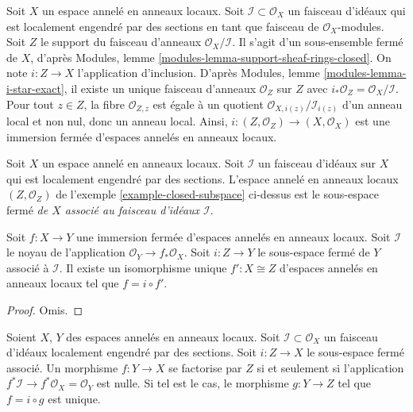 \begin{example}
\label{example-closed-subspace}
Soit $X$ un espace annelé en anneaux
locaux. Soit $\mathcal{I} \subset \mathcal{O}_X$ un faisceau
d'idéaux qui est localement engendré par des sections en tant
que faisceau de $\mathcal{O}_X$-modules. Soit $Z$ le support
du faisceau d'anneaux $\mathcal{O}_X/\mathcal{I}$. Il
s'agit d'un sous-ensemble fermé de
$X$, d'après Modules, lemme \ref{modules-lemma-support-sheaf-rings-closed}.
On note $i : Z \to X$ l'application
d'inclusion. D'après Modules, lemme \ref{modules-lemma-i-star-exact},
il existe un unique faisceau d'anneaux $\mathcal{O}_Z$
sur $Z$ avec $i_*\mathcal{O}_Z = \mathcal{O}_X/\mathcal{I}$.
Pour tout $z \in Z$, la fibre $\mathcal{O}_{Z,
z}$ est égale à un quotient $\mathcal{O}_{X, i(z)}/\mathcal{I}_{i(z)}$ d'un
anneau local et non nul, donc un anneau local. Ainsi,
$i : (Z, \mathcal{O}_Z) \to (X, \mathcal{O}_X)$ est une
immersion fermée d'espaces annelés en anneaux locaux.
\end{example}

\begin{definition}
\label{definition-closed-subspace}
Soit $X$ un espace annelé en anneaux
locaux. Soit $\mathcal{I}$ un faisceau d'idéaux sur
$X$ qui est localement engendré par des
sections. L'espace annelé en anneaux locaux $(Z,
\mathcal{O}_Z)$ de l'exemple \ref{example-closed-subspace}
ci-dessus est le sous-espace fermé {\it de $X$ associé
au faisceau d'idéaux $\mathcal{I}$}.
\end{definition}

\begin{lemma}
\label{lemma-closed-immersion}
Soit $f : X \to Y$ une immersion fermée d'espaces
annelés en anneaux locaux. Soit $\mathcal{I}$
le noyau de l'application $\mathcal{O}_Y \to f_*\mathcal{O}_X$.
Soit $i : Z \to Y$ le sous-espace fermé de $Y$
associé à $\mathcal{I}$. Il
existe un isomorphisme unique $f' : X \cong Z$ d'espaces
annelés en anneaux locaux tel que $f = i \circ f'$.
\end{lemma}

\begin{proof}
Omis.
\end{proof}

\begin{lemma}
\label{lemma-characterize-closed-subspace}
Soient $X$, $Y$ des espaces annelés en anneaux
locaux. Soit $\mathcal{I} \subset \mathcal{O}_X$ un faisceau d'idéaux localement
engendré par des sections. Soit $i : Z \to X$ le sous-espace fermé associé.
Un morphisme $f : Y \to X$ se factorise par $Z$ si et seulement si
l'application $f^*\mathcal{I} \to f^*\mathcal{O}_X = \mathcal{O}_Y$
est nulle. Si tel est le cas, le morphisme $g : Y \to
Z$ tel que $f = i \circ g$ est unique.
\end{lemma}

